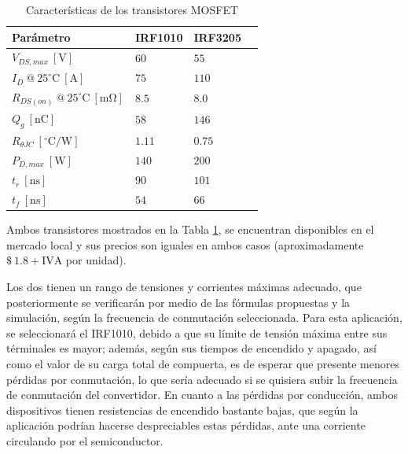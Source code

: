 \documentclass[conference]{IEEEtran}
\begin{document}
\begin{table}[H]
    \centering
    \renewcommand{\arraystretch}{1.5}
    \begin{tabularx}{\columnwidth}{
        >{\hsize=1.3\hsize}X 
        >{\hsize=0.70\hsize}X 
        >{\hsize=0.75\hsize}X 
        >{\hsize=0.75\hsize}X
    }
        \toprule
        Parámetro                                               & IRF1010 & IRF3205\\
        \midrule
        $V_{DS,max}~\mathrm{[V]}$                               & $60$   & $55$   \\
        $I_{D}~@~25^\circ\mathrm{C}~\mathrm{[A]}$               & $75$   & $110$  \\
        $R_{DS(on)}~@~25^\circ\mathrm{C}~\mathrm{[m\Omega]}$    & $8.5$  & $8.0$  \\
        $Q_{g}~\mathrm{[nC]}$                                   & $58$   & $146$  \\
        $R_{\theta JC}~[^\circ\mathrm{C/W}]$                    & $1.11$ & $0.75$ \\
        $P_{D, max}~\mathrm{[W]}$                               & $140$  & $200$  \\
        $t_{r}~\mathrm{[ns]}$                                   & $90$   & $101$  \\
        $t_{f}~\mathrm{[ns]}$                                   & $54$   & $66$   \\

        \bottomrule
    \end{tabularx}
    \caption{Características de los transistores MOSFET}
    \label{tab:mosfet_comparison}
\end{table}

Ambos transistores mostrados en la Tabla \ref{tab:mosfet_comparison}, se encuentran disponibles en el mercado local y sus precios
son iguales en ambos casos (aproximadamente $\mathrm{\$}~1.8 + \mathrm{IVA}$ por unidad). 

Los dos tienen un rango de tensiones y corrientes máximas adecuado, que posteriormente se verificarán por medio de las fórmulas propuestas 
y la simulación, según la frecuencia de conmutación seleccionada. Para esta aplicación, se seleccionará el IRF1010, debido a que su 
límite de tensión máxima entre sus términales es mayor; además, según sus tiempos de encendido y apagado, así como el valor de su carga total
de compuerta, es de esperar que presente menores pérdidas por conmutación, lo que sería adecuado si se quisiera subir la frecuencia de conmutación del convertidor. En cuanto
a las pérdidas por conducción, ambos dispositivos tienen resistencias de encendido bastante bajas, que según la aplicación podrían hacerse despreciables
estas pérdidas, ante una corriente circulando por el semiconductor. 
\end{document}
